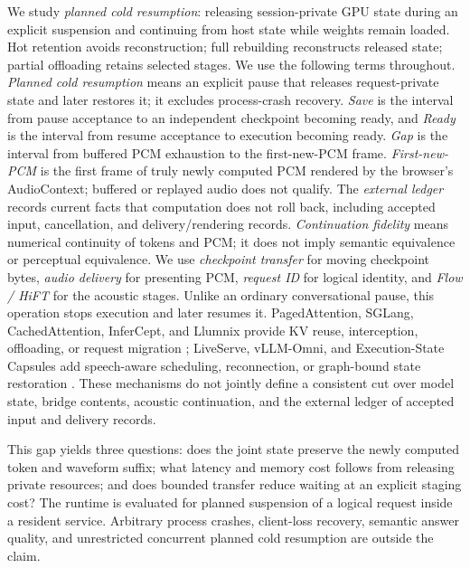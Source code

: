 \documentclass{article}
\begin{document}
We study \emph{planned cold resumption}: releasing session-private GPU
state during an explicit suspension and continuing from host state while
weights remain loaded. Hot retention avoids reconstruction; full rebuilding
reconstructs released state; partial offloading retains selected stages.
We use the following terms throughout. \emph{Planned cold resumption}
means an explicit pause that releases request-private state and later restores
it; it excludes process-crash recovery. \emph{Save} is the interval from pause
acceptance to an independent checkpoint becoming ready, and \emph{Ready} is
the interval from resume acceptance to execution becoming ready. \emph{Gap} is
the interval from buffered PCM exhaustion to the first-new-PCM frame.
\emph{First-new-PCM} is the first frame of truly newly computed PCM rendered by
the browser's AudioContext; buffered or replayed audio does not qualify. The
\emph{external ledger} records current facts that computation does not roll
back, including accepted input, cancellation, and delivery/rendering records.
\emph{Continuation fidelity} means numerical continuity of tokens and PCM; it
does not imply semantic equivalence or perceptual equivalence. We use
\emph{checkpoint transfer} for moving checkpoint bytes, \emph{audio delivery}
for presenting PCM, \emph{request ID} for logical identity, and \emph{Flow / HiFT}
for the acoustic stages.
Unlike an ordinary conversational pause, this operation stops execution
and later resumes it. PagedAttention, SGLang, CachedAttention, InferCept,
and Llumnix provide KV reuse, interception, offloading, or request migration
\citep{vllm2023,sglang2024,cachedattention2024,infercept2024,llumnix2024};
LiveServe, vLLM-Omni, and Execution-State Capsules add speech-aware
scheduling, reconnection, or graph-bound state restoration
\citep{liveserve2026,omnidoc,capsules2026}. These mechanisms do not jointly
define a consistent cut over model state, bridge contents, acoustic
continuation, and the external ledger of accepted input and delivery records.

This gap yields three questions: does the joint state preserve the newly
computed token and waveform suffix; what latency and memory cost follows
from releasing private resources; and does bounded transfer reduce waiting
at an explicit staging cost? The runtime is evaluated for planned suspension
of a logical request inside a resident service. Arbitrary process crashes,
client-loss recovery, semantic answer quality, and unrestricted concurrent
planned cold resumption are outside the claim.
\end{document}

